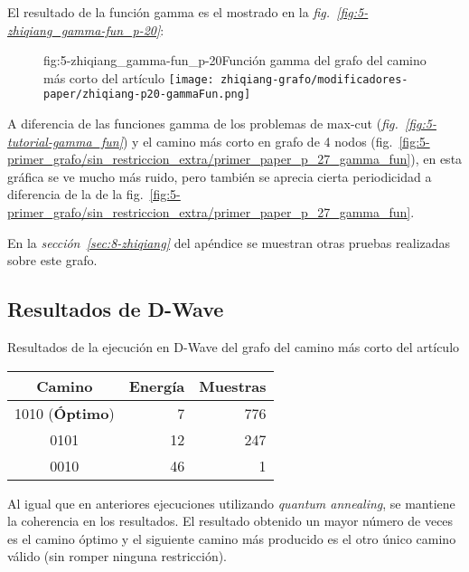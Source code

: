 El resultado de la función gamma es el mostrado en la \textit{fig.~\ref{fig:5-zhiqiang_gamma-fun_p-20}}:

\begin{figure}[Resultados QAOA {--} artículo de Shan et al. {--} función gamma para $P = 20$]{fig:5-zhiqiang_gamma-fun_p-20}{Función gamma del grafo del camino más corto del artículo\cite{solving_shortest_path_with_qaoa}}
  \centering
  \texttt{[image: zhiqiang-grafo/modificadores-paper/zhiqiang-p20-gammaFun.png]}
\end{figure}

A diferencia de las funciones gamma de los problemas de max-cut (\textit{fig.~\ref{fig:5-tutorial-gamma_fun}}) y el camino más corto en grafo de 4 nodos (fig.~\ref{fig:5-primer_grafo/sin_restriccion_extra/primer_paper_p_27_gamma_fun}), en esta gráfica se ve mucho más ruido, pero también se aprecia cierta periodicidad a diferencia de la de la fig.~\ref{fig:5-primer_grafo/sin_restriccion_extra/primer_paper_p_27_gamma_fun}.

En la \textit{sección~\ref{sec:8-zhiqiang}} del apéndice se muestran otras pruebas realizadas sobre este grafo.

\subsection{Resultados de D-Wave}
\begin{table}[Resultados D-Wave {--} artículo de Shan et al.]{}{Resultados de la ejecución en D-Wave del grafo del camino más corto del artículo\cite{solving_shortest_path_with_qaoa}}
  \centering
  \begin{tabular}{|c|r|r|}
    \hline
    \textbf{Camino}        & \textbf{Energía} & \textbf{Muestras} \\ \hline
    1010 (\textbf{Óptimo}) &  7               & 776               \\ \hline
    0101                   & 12               & 247               \\ \hline
    0010                   & 46               &   1               \\ \hline
  \end{tabular}
\end{table}

Al igual que en anteriores ejecuciones utilizando \textit{quantum annealing}, se mantiene la coherencia en los resultados. El resultado obtenido un mayor número de veces es el camino óptimo y el siguiente camino más producido es el otro único camino válido (sin romper ninguna restricción).

